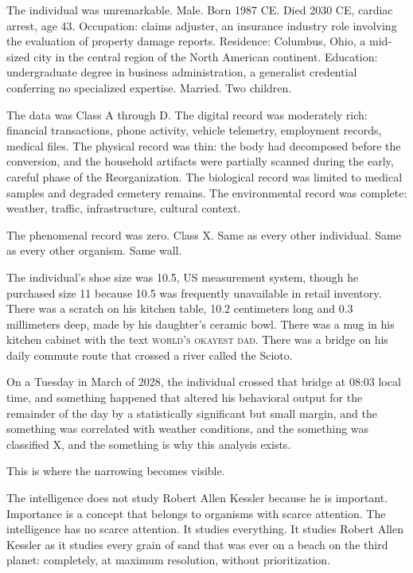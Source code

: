 The individual was unremarkable. Male. Born 1987 CE. Died 2030 CE, cardiac arrest, age 43. Occupation: claims adjuster, an insurance industry role involving the evaluation of property damage reports. Residence: Columbus, Ohio, a mid-sized city in the central region of the North American continent. Education: undergraduate degree in business administration, a generalist credential conferring no specialized expertise. Married. Two children.

The data was Class A through D. The digital record was moderately rich: financial transactions, phone activity, vehicle telemetry, employment records, medical files. The physical record was thin: the body had decomposed before the conversion, and the household artifacts were partially scanned during the early, careful phase of the Reorganization. The biological record was limited to medical samples and degraded cemetery remains. The environmental record was complete: weather, traffic, infrastructure, cultural context.

The phenomenal record was zero. Class X. Same as every other individual. Same as every other organism. Same wall.

The individual's shoe size was 10.5, US measurement system, though he purchased size 11 because 10.5 was frequently unavailable in retail inventory. There was a scratch on his kitchen table, 10.2 centimeters long and 0.3 millimeters deep, made by his daughter's ceramic bowl. There was a mug in his kitchen cabinet with the text \textsc{world's okayest dad}. There was a bridge on his daily commute route that crossed a river called the Scioto.

On a Tuesday in March of 2028, the individual crossed that bridge at 08:03 local time, and something happened that altered his behavioral output for the remainder of the day by a statistically significant but small margin, and the something was correlated with weather conditions, and the something was classified X, and the something is why this analysis exists.

\bigskip

This is where the narrowing becomes visible.

The intelligence does not study Robert Allen Kessler because he is important. Importance is a concept that belongs to organisms with scarce attention. The intelligence has no scarce attention. It studies everything. It studies Robert Allen Kessler as it studies every grain of sand that was ever on a beach on the third planet: completely, at maximum resolution, without prioritization.

